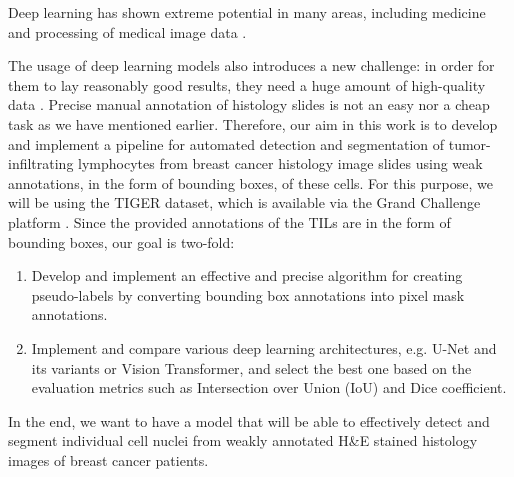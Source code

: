 Deep learning has shown extreme potential in many areas, including medicine and processing of medical image data \cite{LeCun2015}.

The usage of deep learning models also introduces a new challenge: in order for them to lay reasonably good results, they need a huge amount of high-quality data \cite{Santosh2022-3}. Precise manual annotation of histology slides is not an easy nor a cheap task as we have mentioned earlier. Therefore, our aim in this work is to develop and implement a pipeline for automated detection and segmentation of tumor-infiltrating lymphocytes from breast cancer histology image slides using weak annotations, in the form of bounding boxes, of these cells. For this purpose, we will be using the TIGER dataset, which is available via the Grand Challenge platform \cite{tiger_dataset}. Since the provided annotations of the TILs are in the form of bounding boxes, our goal is two-fold:

\begin{enumerate}
 \item Develop and implement an effective and precise algorithm for creating pseudo-labels by converting bounding box annotations into pixel mask annotations.
 \item Implement and compare various deep learning architectures, e.g. U-Net and its variants or Vision Transformer, and select the best one based on the evaluation metrics such as Intersection over Union (IoU) and Dice coefficient.
\end{enumerate}

In the end, we want to have a model that will be able to effectively detect and segment individual cell nuclei from weakly annotated H\&E stained histology images of breast cancer patients.



